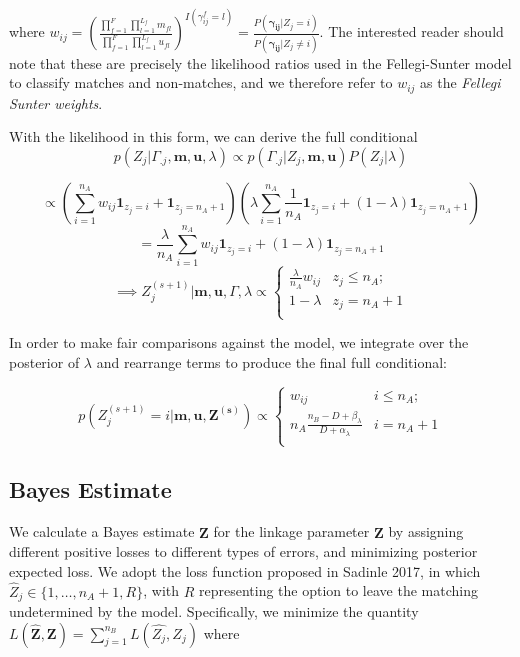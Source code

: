 \documentclass[12pt,letterpaper]{article}
\newcommand{\1}[1]{\mathbb{I}\!\left[#1\right]} %
\begin{document}
where
\(w_{ij} = \left(\frac{\prod_{f=1}^{F}\prod_{l=1}^{L_f} m_{fl}}{\prod_{f=1}^{F}\prod_{l=1}^{L_f} u_{fl}}\right)^{I(\gamma_{ij}^f = l)} = \frac{P(\boldsymbol{\gamma_{ij}}|Z_j = i)}{P(\boldsymbol{\gamma_{ij}} |Z_j \neq i)}\).
The interested reader should note that these are precisely the
likelihood ratios used in the Fellegi-Sunter model to classify matches
and non-matches, and we therefore refer to \(w_{ij}\) as the
\emph{Fellegi Sunter weights}.

With the likelihood in this form, we can derive the full conditional
\[p(Z_j|\Gamma_{.j}, \mathbf{m} ,\mathbf{u}, \lambda) \propto p(\Gamma_{.j}| Z_j, \mathbf{m} ,\mathbf{u}) P(Z_j|\lambda)\]

\[\propto \left(\sum_{i=1}^{n_A}w_{ij}\mathbf{1}_{z_j = i} + \mathbf{1}_{z_j = n_A + 1}\right)\left(\lambda\sum_{i=1}^{n_A}\frac{1}{n_A}\mathbf{1}_{z_j = i} + (1-\lambda)\mathbf{1}_{z_j = n_A + 1}\right)\]
\[= \frac{\lambda}{n_A}\sum_{i=1}^{n_A}w_{ij}\mathbf{1}_{z_j = i} + (1-\lambda)\mathbf{1}_{z_j = n_A + 1} \]
\[ \implies Z_j^{(s+1)} | \mathbf{m}, \mathbf{u}, \Gamma, \lambda \propto
\begin{cases} 
	\frac{\lambda}{n_A}w_{ij}   & z_j \leq n_A; \\
	1-\lambda &  z_j  = n_A + 1 \\
\end{cases}\]

In order to make fair comparisons against the \citep{sadinle2017} model, we
integrate over the posterior of \(\lambda\) and rearrange terms to
produce the final full conditional:

\[p\left(Z_j^{(s+1)}  = i| \mathbf{m}, \mathbf{u}, \mathbf{Z^{(s)}}\right) \propto
\begin{cases} 
	w_{ij}  & i \leq n_A; \\
	n_A \frac{n_B - D + \beta_{\lambda}}{D + \alpha_{\lambda}} & i  = n_A + 1 \\
\end{cases}\]

\hypertarget{bayes-estimate}{%
	\subsection{Bayes Estimate}
	\label{bayes-estimate}}

We calculate a Bayes estimate \(\hat{\mathbf{Z}}\) for the linkage
parameter \(\mathbf{Z}\) by assigning different positive losses to
different types of errors, and minimizing posterior expected loss. We
adopt the loss function proposed in Sadinle 2017, in which
\(\hat{Z}_j \in \{1, \ldots, n_A + 1, R\}\), with \(R\) representing the
option to leave the matching undetermined by the model. Specifically, we
minimize the quantity
\(L(\hat{\mathbf{Z}}, \mathbf{Z}) = \sum_{j=1}^{n_B} L(\hat{Z_j}, Z_j)\)
where
\end{document}

